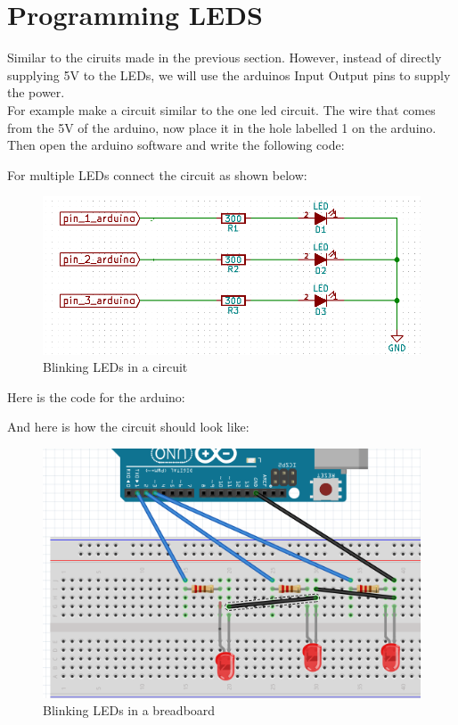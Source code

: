 \documentclass[14pt]{memoir}
\begin{document}
\section*{Programming LEDS}
Similar to the ciruits made in the previous section. However,
instead of directly supplying 5V to the LEDs, we will use the
arduinos Input Output pins to supply the power.
\\
For example make a circuit similar to the one led circuit. The
wire that comes from the 5V of the arduino, now place it in the
hole labelled 1 on the arduino.
\\
Then open the arduino software and write the following code:


For multiple LEDs connect the circuit as shown below:
\begin{figure}[H]
    \includegraphics[width=\linewidth]{circuit_images/blinking_leds.png}
    \caption{Blinking LEDs in a circuit}
\end{figure}

Here is the code for the arduino:



And here is how the circuit should look like:
\begin{figure}[H]
    \includegraphics[width=0.7\linewidth]{circuit_images/fritz_blinking_leds.png}
    \caption{Blinking LEDs in a breadboard}
\end{figure}
\end{document}
